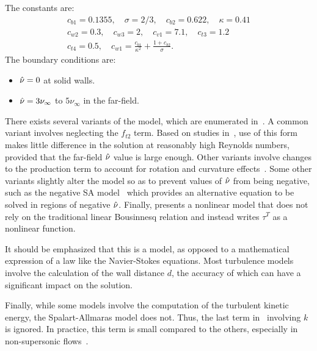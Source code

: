 The constants are:
\begin{gather*}
    c_{b1} = 0.1355, \quad \sigma = 2/3, \quad c_{b2} = 0.622, \quad \kappa = 0.41\\
    c_{w2} = 0.3, \quad c_{w3} = 2, \quad c_{v1} = 7.1, \quad c_{t3} = 1.2\\
    c_{t4} = 0.5, \quad c_{w1} = \frac{c_{b1}}{\kappa^2} + \frac{1 + c_{b2}}{\sigma}.
\end{gather*}
The boundary conditions are:
\begin{itemize}
    \item $\sa = 0$ at solid walls.
    \item $\sa = 3\nu_\infty$ to $5\nu_\infty$ in the far-field.
\end{itemize}
There exists several variants of the model, which are enumerated in~\cite{tmrsa}. A common variant involves neglecting the $f_{t2}$ term. Based on studies in~\cite{rumsey2007apparent}, use of this form makes little difference in the solution at reasonably high Reynolds numbers, provided that the far-field $\sa$ value is large enough. Other variants involve changes to the production term to account for rotation and curvature effects~\cite{shur2000turbulence,dacles1995numerical,dacles1999numerical}. Some other variants slightly alter the model so as to prevent values of $\sa$ from being negative, such as the negative SA model~\cite{allmaras2012modifications} which provides an alternative equation to be solved in regions of negative $\sa$. Finally, \cite{spalart2000strategies} presents a nonlinear model that does not rely on the traditional linear Bousinnesq relation and instead writes $\tau^T$ as a nonlinear function.

It should be emphasized that this is a model, as opposed to a mathematical expression of a law like the Navier-Stokes equations. Most turbulence models involve the calculation of the wall distance $d$, the accuracy of which can have a significant impact on the solution.

Finally, while some models involve the computation of the turbulent kinetic energy, the Spalart-Allmaras model does not. Thus, the last term in~ involving $k$ is ignored. In practice, this term is small compared to the others, especially in non-supersonic flows~\cite{tmrsa}.

